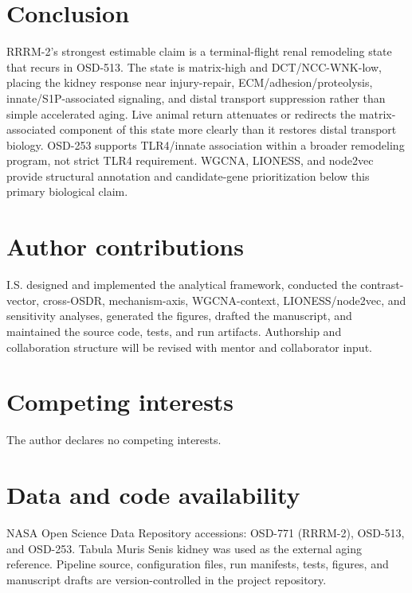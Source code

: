 \documentclass[11pt]{article}
\begin{document}
\section{Conclusion}

RRRM-2's strongest estimable claim is a terminal-flight renal remodeling state that recurs in OSD-513. The state is matrix-high and DCT/NCC-WNK-low, placing the kidney response near injury-repair, ECM/adhesion/proteolysis, innate/S1P-associated signaling, and distal transport suppression rather than simple accelerated aging. Live animal return attenuates or redirects the matrix-associated component of this state more clearly than it restores distal transport biology. OSD-253 supports TLR4/innate association within a broader remodeling program, not strict TLR4 requirement. WGCNA, LIONESS, and node2vec provide structural annotation and candidate-gene prioritization below this primary biological claim.

\section*{Author contributions}
I.S. designed and implemented the analytical framework, conducted the contrast-vector, cross-OSDR, mechanism-axis, WGCNA-context, LIONESS/node2vec, and sensitivity analyses, generated the figures, drafted the manuscript, and maintained the source code, tests, and run artifacts. Authorship and collaboration structure will be revised with mentor and collaborator input.

\section*{Competing interests}
The author declares no competing interests.

\section*{Data and code availability}
NASA Open Science Data Repository accessions: OSD-771 (RRRM-2), OSD-513, and OSD-253. Tabula Muris Senis kidney was used as the external aging reference. Pipeline source, configuration files, run manifests, tests, figures, and manuscript drafts are version-controlled in the project repository.
\end{document}
